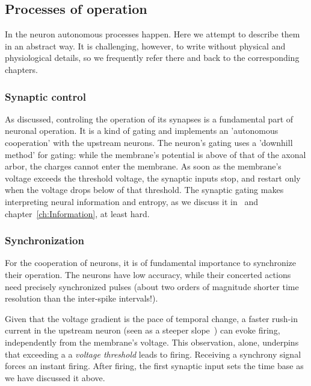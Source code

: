 

\subsection[Processes]{Processes of operation\label{sec:Single-OperationProcesses}}


In the neuron autonomous processes happen.
Here we attempt to describe them in an abstract way.
It is challenging, however, to write without physical and
physiological details, so we frequently refer there and back
to the corresponding
chapters.


\subsubsection[Synaptic]{Synaptic control\label{sec:Single_AP_Synaptic}}
As discussed, controling the operation of its synapses is a
fundamental part of neuronal operation. It is 
a kind of gating and implements an 'autonomous cooperation' with 
the upstream neurons. The neuron's gating uses
a 'downhill method' for gating: while the membrane's potential
is above of that of the axonal arbor, the charges cannot enter the membrane.
As soon as the membrane's voltage exceeds the threshold voltage, the synaptic inputs stop, and restart only when the voltage drops below of that threshold.
The synaptic gating makes interpreting neural information and entropy, as we discuss it in~\cite{VeghNeuralShannon:2022} and chapter~\ref{ch:Information}, at least hard.

\subsubsection[Synchronization]{Synchronization\label{sec:Single-OperationSynchronization}}

For the cooperation of neurons, it is of fundamental importance 
to synchronize their operation. The neurons have low accuracy,
while their concerted actions need precisely synchronized  
pulses (about two orders of magnitude shorter time resolution
than the inter-spike intervals!).

Given that the voltage gradient is the pace of temporal change,
a faster rush-in current in the upstream neuron (seen as
a steeper slope~\cite{LosonczyIntegrative:2006})
can evoke firing, independently from the membrane's voltage. 
This observation, alone, underpins
that exceeding a a \textit{voltage threshold}
leads to firing.
Receiving a synchrony signal forces an instant firing. After firing,
the first synaptic input sets the time base as we have discussed it above.

